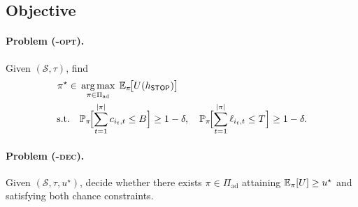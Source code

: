 \subsection{Objective}
\paragraph{Problem (\CBSLAO-\textsc{opt}).}
Given $(\mathcal{S}, \tau)$, find
\begin{align*}
  \pi^\star \in{}&
  \operatorname*{arg\,max}_{\pi \in \Pi_{\mathrm{ad}}}\;
  \mathbb{E}_\pi\!\bigl[U(h_{\mathsf{STOP}})\bigr] \\
  \text{s.t.}\quad&
  \mathbb{P}_\pi\!\Bigl[\sum_{t=1}^{|\pi|} c_{i_t, t} \le B\Bigr] \ge 1 - \delta,\quad
  \mathbb{P}_\pi\!\Bigl[\sum_{t=1}^{|\pi|} \ell_{i_t, t} \le T\Bigr] \ge 1 - \delta.
\end{align*}

\paragraph{Problem (\CBSLAO-\textsc{dec}).}
Given $(\mathcal{S}, \tau, u^\star)$, decide whether there exists
$\pi \in \Pi_{\mathrm{ad}}$ attaining
$\mathbb{E}_\pi[U] \ge u^\star$ and satisfying both chance constraints.
